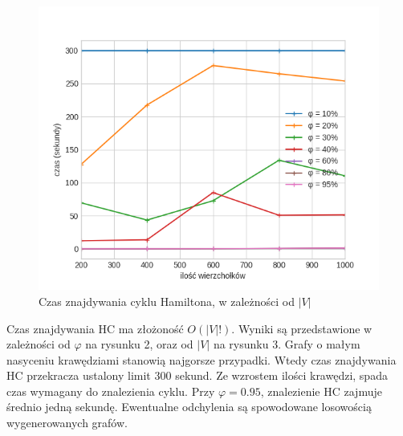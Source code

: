 \documentclass[11pt,twocolumn]{article}
\begin{document}
\begin{figure}[h!]
	\includegraphics[width=\linewidth]{hamil.png}
	\caption{Czas znajdywania cyklu Hamiltona, w zależności od $|V|$ \label{hamil}}
\end{figure}

Czas znajdywania HC ma złożoność $O(|V|!)$.
Wyniki są przedstawione w zależności od $\varphi$ na rysunku 2,
oraz od $|V|$ na rysunku 3.
Grafy o małym nasyceniu krawędziami stanowią najgorsze przypadki.
Wtedy czas znajdywania HC przekracza ustalony limit $300$ sekund.
Ze wzrostem ilości krawędzi, spada czas wymagany do znalezienia cyklu.
Przy $\varphi = 0.95$, znalezienie HC zajmuje średnio jedną sekundę.
Ewentualne odchylenia są spowodowane losowością wygenerowanych grafów.
\end{document}
